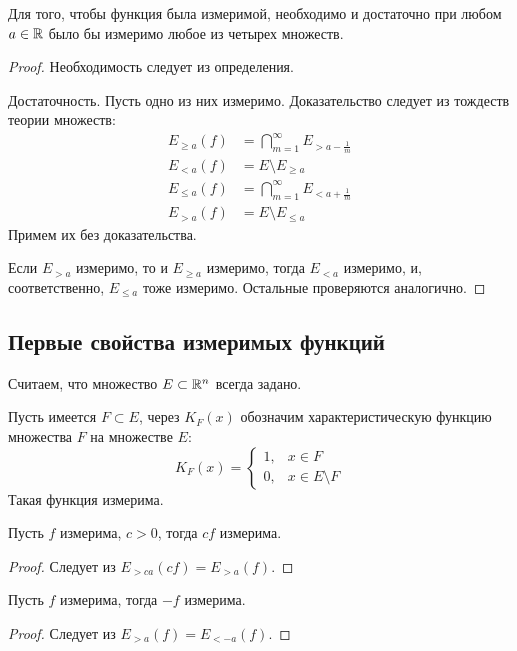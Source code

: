 \documentclass[main]{subfiles}
\begin{document}
\begin{theorem}
    Для того, чтобы функция была измеримой, необходимо и достаточно при любом $a \in \mathbb{R}$ было бы измеримо любое из четырех множеств.
\end{theorem}
\begin{proof}
    Необходимость следует из определения.

    Достаточность.
    Пусть одно из них измеримо.
    Доказательство следует из тождеств теории множеств:
    \[\begin{aligned}
            E_{\ge a}(f) & = \bigcap_{m=1}^\infty E_{> a - \frac{1}{m}} \\
            E_{< a}(f)   & = E \setminus E_{\ge a}                      \\
            E_{\le a}(f) & = \bigcap_{m=1}^\infty E_{< a + \frac{1}{m}} \\
            E_{> a}(f)   & = E \setminus E_{\le a}
        \end{aligned} \tag{1}\]
    Примем их без доказательства.

    Если $E_{>a}$ измеримо, то и $E_{\ge a}$ измеримо, тогда $E_{< a}$ измеримо, и, соответственно, $E_{\le a}$ тоже измеримо.
    Остальные проверяются аналогично.
\end{proof}

\subsection{Первые свойства измеримых функций}
Считаем, что множество $E \subset \mathbb{R}^n$ всегда задано.

\begin{property}
    Пусть имеется $F \subset E$, через $K_F(x)$ обозначим характеристическую функцию множества $F$ на множестве $E$:
    \[K_F(x) = \begin{cases}
            1, & x \in F             \\
            0, & x \in E \setminus F
        \end{cases}\]
    Такая функция измерима.
\end{property}

\begin{property}
    Пусть $f$ измерима, $c > 0$, тогда $cf$ измерима.
\end{property}
\begin{proof}
    Следует из $E_{> ca} (cf) = E_{>a} (f)$.
\end{proof}

\begin{property}
    Пусть $f$ измерима, тогда $-f$ измерима.
\end{property}
\begin{proof}
    Следует из $E_{>a}(f) = E_{< -a} (f)$.
\end{proof}
\end{document}
